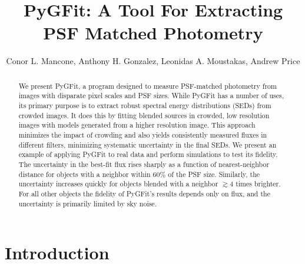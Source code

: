 \documentclass[preprint]{aastex}
\makeatletter
\newcommand{\myemail}{cmancone@astro.ufl.edu}
\newcommand{\sersic}{S\'{e}rsic}
\newcommand{\pygfit}{PyGFit}
\makeatother
\begin{document}

\title{PyGFit: A Tool For Extracting PSF Matched Photometry}

\author{Conor L. Mancone,
Anthony H. Gonzalez,
Leonidas A. Moustakas,
Andrew Price
}

\email{\myemail}

\begin{abstract}
We present \pygfit{}, a program designed to measure PSF-matched photometry from images with disparate pixel scales and PSF sizes.  While \pygfit{} has a number of uses, its primary purpose is to extract robust spectral energy distributions (SEDs) from crowded images.  It does this by fitting blended sources in crowded, low resolution images with models generated from a higher resolution image.  This approach minimizes the impact of crowding and also yields consistently measured fluxes in different filters, minimizing systematic uncertainty in the final SEDs.  
We present an example of applying \pygfit{} to real data and perform simulations to test its fidelity.  
The uncertainty in the best-fit flux rises sharply as a function of nearest-neighbor distance for objects with a neighbor within $60\%$ of the PSF size.  Similarly, the uncertainty increases quickly for objects blended with a neighbor $\gtrsim4$ times brighter.  For all other objects the fidelity of \pygfit{}'s results depends only on flux, and the uncertainty is primarily limited by sky noise.
\end{abstract}


\section{Introduction}\label{sec:intro}
\end{document}
